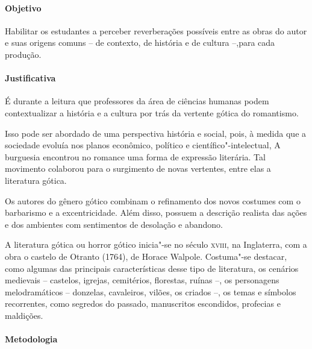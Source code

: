 \documentclass[12pt]{extarticle}
\begin{document}
\paragraph{Objetivo} Habilitar os estudantes a perceber reverberações possíveis 
entre as obras do autor e suas origens comuns -- de contexto, de história e de 
cultura --,para cada produção.

\paragraph{Justificativa} É durante a leitura que professores da área de ciências humanas
podem contextualizar a história e a cultura por trás da vertente gótica
do romantismo.

Isso pode ser abordado de uma perspectiva história e social, pois, à
medida que a sociedade evoluía nos planos econômico, político e
científico"-intelectual, A burguesia encontrou no romance uma forma de
expressão literária. Tal movimento colaborou para o surgimento de novas
vertentes, entre elas a literatura gótica.

Os autores do gênero gótico combinam o refinamento dos novos costumes
com o barbarismo e a excentricidade. Além disso, possuem a descrição
realista das ações e dos ambientes com sentimentos de desolação e
abandono.

A literatura gótica ou horror gótico inicia"-se no século \textsc{xviii}, na
Inglaterra, com a obra o castelo de Otranto (1764), de Horace Walpole.
Costuma"-se destacar, como algumas das principais características desse
tipo de literatura, os cenários medievais -- castelos, igrejas,
cemitérios, florestas, ruínas --, os personagens melodramáticos -- donzelas,
cavaleiros, vilões, os criados --, os temas e símbolos recorrentes, como segredos do 
passado, manuscritos escondidos, profecias e maldições.


\paragraph{Metodologia}
\end{document}
